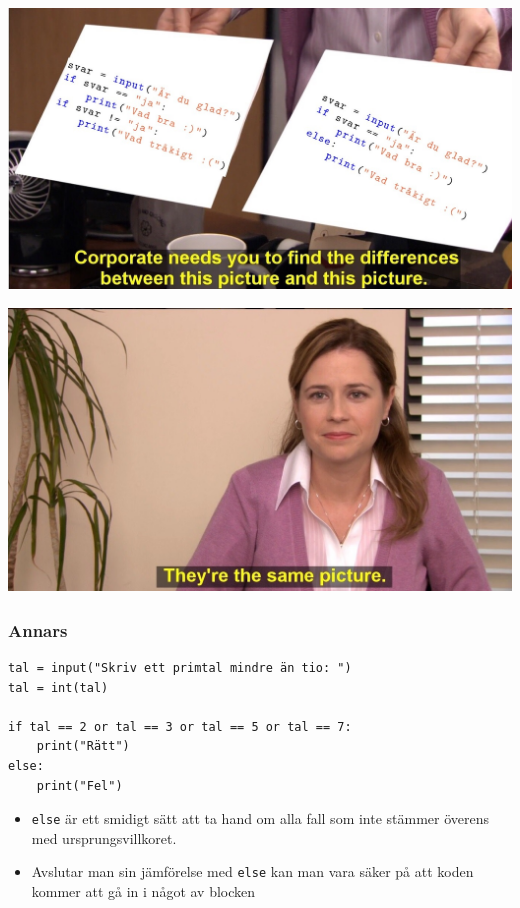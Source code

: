 \documentclass[aspectratio=169]{beamer}
\begin{document}
\begin{frame}

	\includegraphics[width=\linewidth]{corporate1.jpg}

\end{frame}

\begin{frame}

	\includegraphics[width=\linewidth]{corporate2.jpg}

\end{frame}

\begin{frame}[fragile]
	\frametitle{Annars}
	
	\begin{lstlisting}
tal = input("Skriv ett primtal mindre än tio: ")
tal = int(tal)

if tal == 2 or tal == 3 or tal == 5 or tal == 7:
	print("Rätt")
else:
	print("Fel")
	\end{lstlisting}
	
	\begin{itemize}
		\item \lstinline{else} är ett smidigt sätt att ta hand om alla fall som inte stämmer överens med ursprungsvillkoret.
		\item Avslutar man sin jämförelse med \lstinline{else} kan man vara säker på att koden kommer att gå in i något av blocken
	\end{itemize}


\end{frame}
\end{document}
